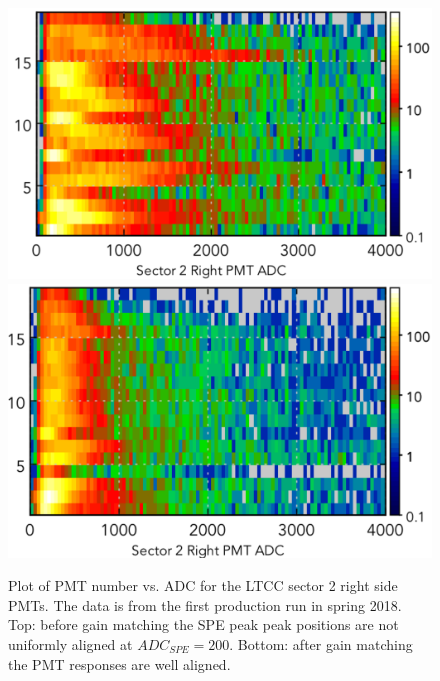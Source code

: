 \begin{figure}[H]
	\centering
	\includegraphics[width=1.05\columnwidth, keepaspectratio]{img/gainMatchingBefore.png}
	\includegraphics[width=1.05\columnwidth, keepaspectratio]{img/gainMatchingAfter.png}
	\caption{Plot of PMT number vs. ADC for the LTCC sector 2 right side PMTs. The data is from the first
          production run in spring 2018. Top: before gain matching the SPE peak peak positions are not uniformly
          aligned at $ADC_{SPE} = 200$. Bottom: after gain matching the PMT responses are well aligned.}
	\label{fig:gainMatching}
\end{figure}

